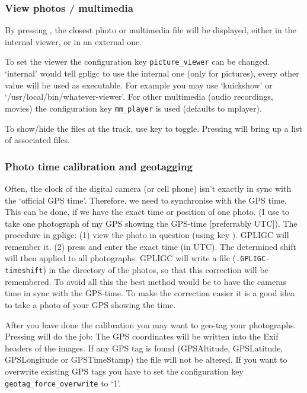 \subsubsection{View photos / multimedia}
By pressing , the closest photo or multimedia file will be displayed, either in
the internal viewer, or in an external one.

To set the viewer the configuration key \texttt{picture\_viewer} can be changed. `internal' would tell
gpligc to use the internal one (only for pictures), every other value will be used as executable. For example you may use
`kuickshow' or `/usr/local/bin/whatever-viewer'.
For other multimedia (audio recordings, movies) the configuration key \texttt{mm\_player} is used (defaults to mplayer).

To show/hide the files at the track, use key  to toggle. Pressing  will bring up a list of associated files.

\subsubsection{Photo time calibration and geotagging}
\label{photo_time}
Often, the clock of the digital camera (or cell phone) isn't exactly in sync with the `official GPS time'.
Therefore, we need to synchronise with the GPS time.
This can be done, if we have the exact time or position of one photo.
(I use to take one photograph of my GPS showing the GPS-time [preferrably UTC]).
The procedure in gpligc: (1) view the photo in question (using key ).
GPLIGC will remember it. (2) press  and enter the exact time (in UTC).
The determined shift will then applied to all photographs.
GPLIGC will write a file (\texttt{.GPLIGC-timeshift}) in the directory of the photos, so that this correction will be remembered.
To avoid all this the best method would be to have the cameras time in sync with the GPS-time. To make the correction easier it is a good idea to take a photo of your GPS showing the time.

After you have done the calibration you may want to geo-tag your photographs. Pressing  will do the job: The GPS coordinates will be written into the Exif headers of the images.
If any GPS tag is found (GPSAltitude, GPSLatitude, GPSLongitude or GPSTimeStamp) the file will not be altered.
If you want to overwrite existing GPS tags you have to set the configuration key \texttt{geotag\_force\_overwrite} to `1'.


